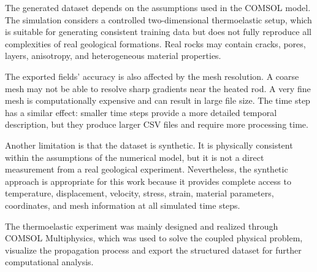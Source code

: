 The generated dataset depends on the assumptions used in the COMSOL model. The simulation considers a controlled two-dimensional thermoelastic setup, which is suitable for generating consistent training data but does not fully reproduce all complexities of real geological formations. Real rocks may contain cracks, pores, layers, anisotropy, and heterogeneous material properties.

The exported fields' accuracy is also affected by the mesh resolution. A coarse mesh may not be able to resolve sharp gradients near the heated rod. A very fine mesh is computationally expensive and can result in large file size. The time step has a similar effect: smaller time steps provide a more detailed temporal description, but they produce larger CSV files and require more processing time.

Another limitation is that the dataset is synthetic. It is physically consistent within the assumptions of the numerical model, but it is not a direct measurement from a real geological experiment. Nevertheless, the synthetic approach is appropriate for this work because it provides complete access to temperature, displacement, velocity, stress, strain, material parameters, coordinates, and mesh information at all simulated time steps.

The thermoelastic experiment was mainly designed and realized through COMSOL Multiphysics, which was used to solve the coupled physical problem, visualize the propagation process and export the structured dataset for further computational analysis.
